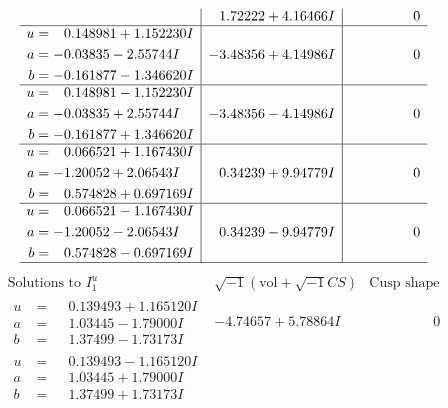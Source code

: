 \documentclass[1p]{elsarticle_modified}
\theoremstyle{definition}
\newcommand{\I}{\sqrt{-1}}
\begin{document}
$$\begin{array}{c|c|c}
 & \phantom{-}1.72222 + 4.16466 I & \phantom{-0.000000 } 0 \\ \hline\begin{aligned}
u &= \phantom{-}0.148981 + 1.152230 I \\
a &= -0.03835 - 2.55744 I \\
b &= -0.161877 - 1.346620 I\end{aligned}
 & -3.48356 + 4.14986 I & \phantom{-0.000000 } 0 \\ \hline\begin{aligned}
u &= \phantom{-}0.148981 - 1.152230 I \\
a &= -0.03835 + 2.55744 I \\
b &= -0.161877 + 1.346620 I\end{aligned}
 & -3.48356 - 4.14986 I & \phantom{-0.000000 } 0 \\ \hline\begin{aligned}
u &= \phantom{-}0.066521 + 1.167430 I \\
a &= -1.20052 + 2.06543 I \\
b &= \phantom{-}0.574828 + 0.697169 I\end{aligned}
 & \phantom{-}0.34239 + 9.94779 I & \phantom{-0.000000 } 0 \\ \hline\begin{aligned}
u &= \phantom{-}0.066521 - 1.167430 I \\
a &= -1.20052 - 2.06543 I \\
b &= \phantom{-}0.574828 - 0.697169 I\end{aligned}
 & \phantom{-}0.34239 - 9.94779 I & \phantom{-0.000000 } 0\\
 \hline 
 \end{array}$$\newpage$$\begin{array}{c|c|c}  
\text{Solutions to }I^u_{1}& \I (\text{vol} + \sqrt{-1}CS) & \text{Cusp shape}\\
 \hline 
\begin{aligned}
u &= \phantom{-}0.139493 + 1.165120 I \\
a &= \phantom{-}1.03445 - 1.79000 I \\
b &= \phantom{-}1.37499 - 1.73173 I\end{aligned}
 & -4.74657 + 5.78864 I & \phantom{-0.000000 } 0 \\ \hline\begin{aligned}
u &= \phantom{-}0.139493 - 1.165120 I \\
a &= \phantom{-}1.03445 + 1.79000 I \\
b &= \phantom{-}1.37499 + 1.73173 I\end{aligned}

\end{array}$$
\end{document}
